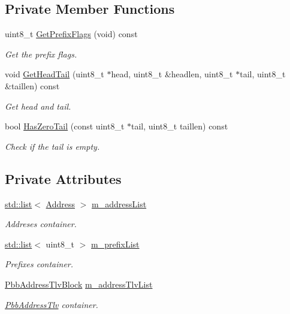 \subsection*{Private Member Functions}
\begin{DoxyCompactItemize}
\item 
uint8\+\_\+t \hyperlink{classns3_1_1PbbAddressBlock_a2f3cdb0d9f20d508f72a3e7161cdbead}{Get\+Prefix\+Flags} (void) const 
\begin{DoxyCompactList}\small\item\em Get the prefix flags. \end{DoxyCompactList}\item 
void \hyperlink{classns3_1_1PbbAddressBlock_a558425b81a30663f8da08805c749f1c5}{Get\+Head\+Tail} (uint8\+\_\+t $\ast$head, uint8\+\_\+t \&headlen, uint8\+\_\+t $\ast$tail, uint8\+\_\+t \&taillen) const 
\begin{DoxyCompactList}\small\item\em Get head and tail. \end{DoxyCompactList}\item 
bool \hyperlink{classns3_1_1PbbAddressBlock_a06287098fb0bfb04659e1f412602d64f}{Has\+Zero\+Tail} (const uint8\+\_\+t $\ast$tail, uint8\+\_\+t taillen) const 
\begin{DoxyCompactList}\small\item\em Check if the tail is empty. \end{DoxyCompactList}\end{DoxyCompactItemize}
\subsection*{Private Attributes}
\begin{DoxyCompactItemize}
\item 
\hyperlink{openflow-interface_8h_afd9bcfa176617760671b67580f536fa7}{std\+::list}$<$ \hyperlink{classns3_1_1Address}{Address} $>$ \hyperlink{classns3_1_1PbbAddressBlock_a155cb46a9aa55bb6d8b885000685396a}{m\+\_\+address\+List}
\begin{DoxyCompactList}\small\item\em Addreses container. \end{DoxyCompactList}\item 
\hyperlink{openflow-interface_8h_afd9bcfa176617760671b67580f536fa7}{std\+::list}$<$ uint8\+\_\+t $>$ \hyperlink{classns3_1_1PbbAddressBlock_a8af9b3c3361ad6f708bf9afae1fc2969}{m\+\_\+prefix\+List}
\begin{DoxyCompactList}\small\item\em Prefixes container. \end{DoxyCompactList}\item 
\hyperlink{classns3_1_1PbbAddressTlvBlock}{Pbb\+Address\+Tlv\+Block} \hyperlink{classns3_1_1PbbAddressBlock_aee976005ebb4d8ebeaec3e155d4800f1}{m\+\_\+address\+Tlv\+List}
\begin{DoxyCompactList}\small\item\em \hyperlink{classns3_1_1PbbAddressTlv}{Pbb\+Address\+Tlv} container. \end{DoxyCompactList}\end{DoxyCompactItemize}
